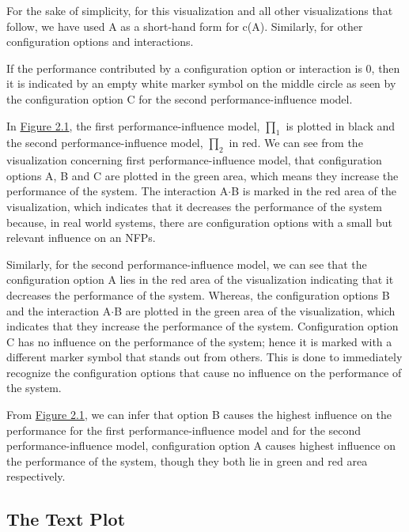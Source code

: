 For the sake of simplicity, for this visualization and all other visualizations that follow, we have used A as a short-hand form for c(A).  Similarly, for other configuration options and interactions.

If the performance contributed by a configuration option or interaction is 0, then it is indicated by an empty white marker symbol on the middle circle as seen by the configuration option C for the second performance-influence model.

In \hyperref[radaPlot]{Figure 2.1}, the first performance-influence model, $\prod_1$ is plotted in black and the second performance-influence model, $\prod_2$ in red. We can see from the visualization concerning first performance-influence model, that configuration options A, B and C are plotted in the green area, which means they increase the performance of the system. The interaction A$\cdot$B is marked in the red area of the visualization, which indicates that it decreases the performance of the system because, in real world systems, there are configuration options with a small but relevant influence on an NFPs.

Similarly, for the second performance-influence model, we can see that the configuration option A lies in the red area of the visualization indicating that it decreases the performance of the system. Whereas, the configuration options B and the interaction A$\cdot$B are plotted in the green area of the visualization, which indicates that they increase the performance of the system. Configuration option C has no influence on the performance of the system; hence it is marked with a different marker symbol that stands out from others. This is done to immediately recognize the configuration options that cause no influence on the performance of the system.

From \hyperref[radaPlot]{Figure 2.1}, we can infer that option B causes the highest influence on the performance for the first performance-influence model and for the second performance-influence model, configuration option A causes highest influence on the performance of the system, though they both lie in green and red area respectively. 

\subsection{The Text Plot}

